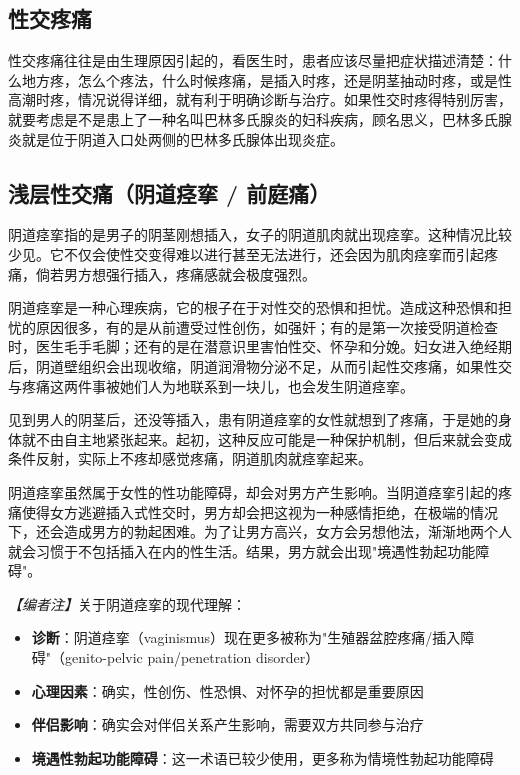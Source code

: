 \begin{enumerate}
\section{性交疼痛}

性交疼痛往往是由生理原因引起的，看医生时，患者应该尽量把症状描述清楚：什么地方疼，怎么个疼法，什么时候疼痛，是插入时疼，还是阴茎抽动时疼，或是性高潮时疼，情况说得详细，就有利于明确诊断与治疗。如果性交时疼得特别厉害，就要考虑是不是患上了一种名叫巴林多氏腺炎的妇科疾病，顾名思义，巴林多氏腺炎就是位于阴道入口处两侧的巴林多氏腺体出现炎症。

\subsection{浅层性交痛（阴道痉挛 / 前庭痛）}

阴道痉挛指的是男子的阴茎刚想插入，女子的阴道肌肉就出现痉挛。这种情况比较少见。它不仅会使性交变得难以进行甚至无法进行，还会因为肌肉痉挛而引起疼痛，倘若男方想强行插入，疼痛感就会极度强烈。

阴道痉挛是一种心理疾病，它的根子在于对性交的恐惧和担忧。造成这种恐惧和担忧的原因很多，有的是从前遭受过性创伤，如强奸；有的是第一次接受阴道检查时，医生毛手毛脚；还有的是在潜意识里害怕性交、怀孕和分娩。妇女进入绝经期后，阴道壁组织会出现收缩，阴道润滑物分泌不足，从而引起性交疼痛，如果性交与疼痛这两件事被她们人为地联系到一块儿，也会发生阴道痉挛。

见到男人的阴茎后，还没等插入，患有阴道痉挛的女性就想到了疼痛，于是她的身体就不由自主地紧张起来。起初，这种反应可能是一种保护机制，但后来就会变成条件反射，实际上不疼却感觉疼痛，阴道肌肉就痉挛起来。

阴道痉挛虽然属于女性的性功能障碍，却会对男方产生影响。当阴道痉挛引起的疼痛使得女方逃避插入式性交时，男方却会把这视为一种感情拒绝，在极端的情况下，还会造成男方的勃起困难。为了让男方高兴，女方会另想他法，渐渐地两个人就会习惯于不包括插入在内的性生活。结果，男方就会出现"境遇性勃起功能障碍"。

\noindent\textit{【编者注】}关于阴道痉挛的现代理解：
\begin{itemize}
	\item \textbf{诊断}：阴道痉挛（vaginismus）现在更多被称为"生殖器盆腔疼痛/插入障碍"（genito-pelvic pain/penetration disorder）
	\item \textbf{心理因素}：确实，性创伤、性恐惧、对怀孕的担忧都是重要原因
	\item \textbf{伴侣影响}：确实会对伴侣关系产生影响，需要双方共同参与治疗
	\item \textbf{境遇性勃起功能障碍}：这一术语已较少使用，更多称为情境性勃起功能障碍
\end{itemize}


\end{enumerate}
